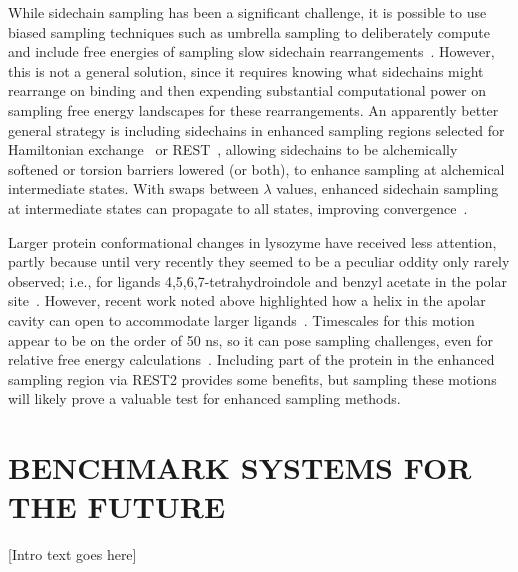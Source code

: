 \documentclass[aps,pre,twocolumn,nofootinbib,superscriptaddress,10pt, final,tightenlines]{revtex4-1}
\newcommand{\major}[1]{\todo[color=red]{#1}}
\begin{document}
While sidechain sampling has been a significant challenge, it is possible to use biased sampling techniques such as umbrella sampling to deliberately compute and include free energies of sampling slow sidechain rearrangements~\cite{mobley_confine_2007}. 
However, this is not a general solution, since it requires knowing what sidechains might rearrange on binding and then expending substantial computational power on sampling free energy landscapes for these rearrangements. 
An apparently better general strategy is including sidechains in enhanced sampling regions selected for Hamiltonian exchange~\cite{jiang_free_2010, khavrutskii_improved_2011} or REST~\cite{wang_achieving_2012}, allowing sidechains to be alchemically softened or torsion barriers lowered (or both), to enhance sampling at alchemical intermediate states.
With swaps between $\lambda$ values, enhanced sidechain sampling at intermediate states can propagate to all states, improving convergence~\cite{jiang_free_2010, wang_achieving_2012}.

Larger protein conformational changes in lysozyme have received less attention, partly because until very recently they seemed to be a peculiar oddity only rarely observed; i.e., for ligands 4,5,6,7-tetrahydroindole and benzyl acetate in the polar site~\cite{boyce_predicting_2009}. 
However, recent work noted above highlighted how a helix in the apolar cavity can open to accommodate larger ligands~\cite{merski_homologous_2015}. 
Timescales for this motion appear to be on the order of 50 ns, so it can pose sampling challenges, even for relative free energy calculations~\cite{lim_sensitivity_2016}. 
Including part of the protein in the enhanced sampling region via REST2 provides some benefits, but sampling these motions will likely prove a valuable test for enhanced sampling methods.


\section{BENCHMARK SYSTEMS FOR THE FUTURE}
\major{Write some intro text here}
[Intro text goes here]
\end{document}
